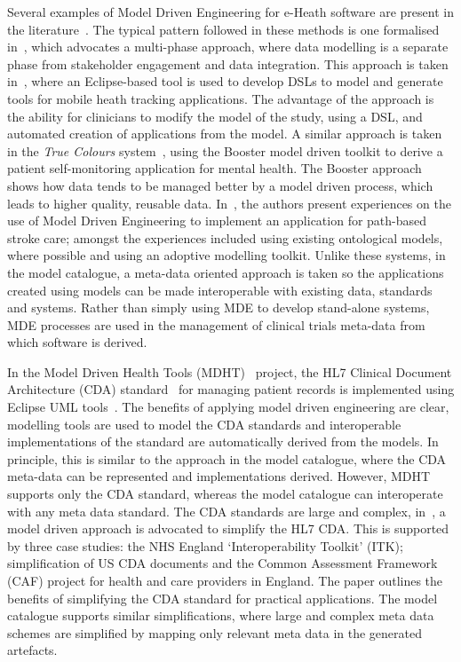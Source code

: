 Several examples of Model Driven Engineering for e-Heath software are present in the literature~\cite{dav14,ragh08,blob07,kham08,schl15}. The typical pattern followed in these methods is one formalised in~\cite{pay12}, which advocates a multi-phase approach, where data modelling is a separate phase from stakeholder engagement and data integration. This approach is taken in~\cite{kham08}, where an Eclipse-based tool is used to develop DSLs to model and generate tools for mobile heath tracking applications. The advantage of the approach is the ability for clinicians to modify the model of the study, using a DSL, and automated creation of applications from the model. A similar approach is taken in the \emph{True Colours} system~\cite{dav14}, using the Booster model driven toolkit to derive a patient self-monitoring application for mental health. The Booster approach shows how data tends to be managed better by a model driven process, which leads to higher quality, reusable data. In~\cite{schl15}, the authors present experiences on the use of Model Driven Engineering to implement an application for path-based stroke care; amongst the experiences included using existing ontological models, where possible and using an adoptive modelling toolkit. Unlike these systems, in the model catalogue, a meta-data oriented approach is taken so the applications created using models can be made interoperable with existing data, standards and systems. Rather than simply using MDE to develop stand-alone systems, MDE processes are used in the management of clinical trials meta-data from which software is derived. 

In the Model Driven Health Tools (MDHT)~\cite{MDHT} project, the HL7 Clinical Document Architecture (CDA) standard~\cite{doli06} for managing patient records is implemented using Eclipse UML tools~\cite{EUML}. The benefits of applying model driven engineering are clear, modelling tools are used to model the CDA standards and interoperable implementations of the standard are automatically derived from the models. In principle, this is similar to the approach in the model catalogue, where the CDA meta-data can be represented and implementations derived. However, MDHT supports only the CDA standard, whereas the model catalogue can interoperate with any meta data standard. The CDA standards are large and complex, in~\cite{sco12}, a model driven approach is advocated to simplify the HL7 CDA. This is supported by three case studies: the NHS England ‘Interoperability Toolkit’ (ITK); simplification of US CDA documents and the Common Assessment Framework (CAF) project for health and care providers in England. The paper outlines the benefits of simplifying the CDA standard for practical applications. The model catalogue supports similar simplifications, where large and complex meta data schemes are simplified by mapping only relevant meta data in the generated artefacts.

